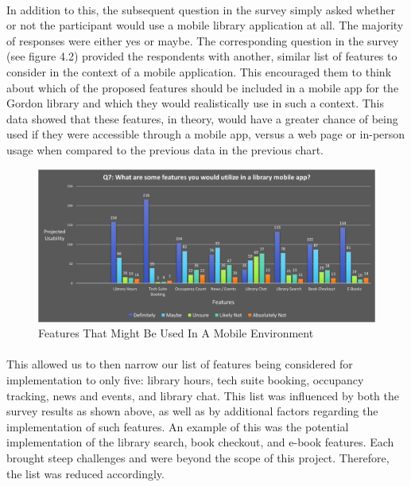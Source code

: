 \paragraph{}
In addition to this, the subsequent question in the survey simply asked whether or not the participant would use a mobile library application at all. The majority of responses were either yes or maybe. The corresponding question in the survey (see figure 4.2) provided the respondents with another, similar list of features to consider in the context of a mobile application. This encouraged them to think about which of the proposed features should be included in a mobile app for the Gordon library and which they would realistically use in such a context. This data showed that these features, in theory, would have a greater chance of being used if they were accessible through a mobile app, versus a web page or in-person usage when compared to the previous data in the previous chart.
  \begin{figure}[H]
        \centering
        \includegraphics[width = \textwidth, height = \textheight, keepaspectratio]{assets/img/Student Survey Results Q7.png}
        \caption{Features That Might Be Used In A Mobile Environment}
    \end{figure}


\paragraph{}
 This allowed us to then narrow our list of features being considered for implementation to only five: library hours, tech suite booking, occupancy tracking, news and events, and library chat. This list was influenced by both the survey results as shown above, as well as by additional factors regarding the implementation of such features. An example of this was the potential implementation of the library search, book checkout, and e-book features. Each brought steep challenges and were beyond the scope of this project. Therefore, the list was reduced accordingly.
 
